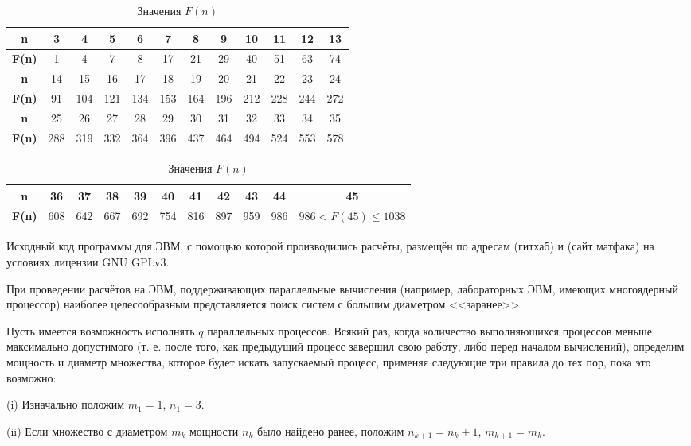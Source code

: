 \documentclass{article}
\begin{document}
\begin{table}[H]
\caption{Значения $F(n)$}
\label{tabular:pc_counted}
\begin{center}
\begin{tabular}{|c|c|c|c|c|c|c|c|c|c|c|c|}
\hline
\textbf{n}    &  3 & 4 & 5 & 6 &  7 &  8 &  9 & 10 & 11 & 12 & 13 \\
\hline
\textbf{F(n)} &  1 & 4 & 7 & 8 & 17 & 21 & 29 & 40 & 51 & 63 & 74  \\
\hline
\hline
\textbf{n}    &  14 &  15 &  16 &  17 &  18 &  19 &  20 &  21 &  22 &  23 &  24 \\
\hline
\textbf{F(n)} &  91 & 104 & 121 & 134 & 153 & 164 & 196 & 212 & 228 & 244 & 272  \\
\hline
\hline
\textbf{n}    &  25 &  26 &  27 &  28 &  29 &  30 &  31 &  32 &  33 &  34 &  35 \\
\hline
\textbf{F(n)} & 288 & 319 & 332 & 364 & 396 & 437 & 464 & 494 & 524 & 553 & 578  \\
\hline
\end{tabular}
\begin{tabular}{|c|c|c|c|c|c|c|c|c|c|c|}
\hline
\textbf{n}    &  36 &  37 &  38 &  39 &  40 &  41 &  42 &  43 &  44 & 45\\
\hline
\textbf{F(n)} & 608 & 642 & 667 & 692 & 754 & 816 & 897 & 959 & 986 & $986<F(45)\leq 1038$\\
\hline
\end{tabular}
\end{center}
\end{table}


Исходный код программы для ЭВМ, с помощью которой производились расчёты, размещён по адресам (гитхаб) и (сайт матфака) на условиях лицензии GNU GPLv3. 


При проведении расчётов на ЭВМ, поддерживающих параллельные вычисления (например, лабораторных ЭВМ, имеющих многоядерный процессор) наиболее целесообразным представляется поиск систем с большим диаметром <<заранее>>.

Пусть имеется возможность исполнять $q$ параллельных процессов.
Всякий раз, когда количество выполняющихся процессов меньше максимально допустимого (т. е. после того, как предыдущий процесс завершил свою работу, либо перед началом вычислений), определим мощность и диаметр множества, которое будет искать запускаемый процесс, применяя следующие три правила до тех пор, пока это возможно:

(i)
Изначально положим $m_1=1$, $n_1=3$.

(ii)
Если множество с диаметром $m_k$ мощности $n_k$ было найдено ранее, положим $n_{k+1} = n_k +1$, $m_{k+1} = m_k$.
\end{document}
